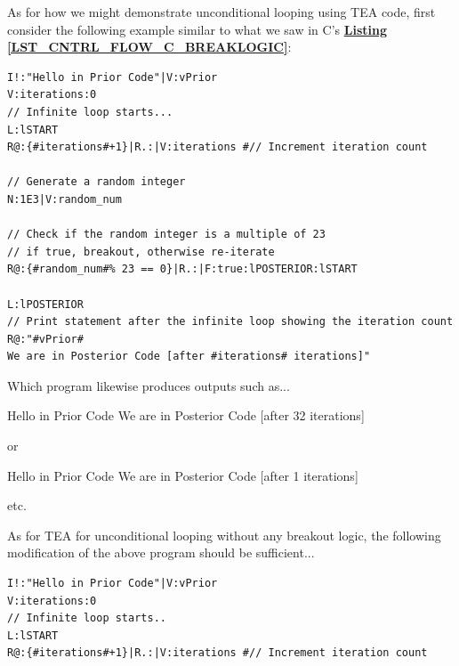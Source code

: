 \documentclass[a4paper, 18pt]{book} %
\begin{document}
{{{\begin{appendices}
As for how we might demonstrate unconditional looping using TEA code, first consider the following example similar to what we saw in C's \textbf{\hyperref[LST_CNTRL_FLOW_C_BREAKLOGIC]{Listing \ref{LST_CNTRL_FLOW_C_BREAKLOGIC}}}:



   
         \begin{tcolorbox}[teaterminalstyle,]
         \begin{lstlisting}[language=TEA,breaklines=true,]
I!:"Hello in Prior Code"|V:vPrior
V:iterations:0
// Infinite loop starts...
L:lSTART
R@:{#iterations#+1}|R.:|V:iterations #// Increment iteration count
        
// Generate a random integer
N:1E3|V:random_num

// Check if the random integer is a multiple of 23
// if true, breakout, otherwise re-iterate
R@:{#random_num#% 23 == 0}|R.:|F:true:lPOSTERIOR:lSTART

L:lPOSTERIOR
// Print statement after the infinite loop showing the iteration count
R@:"#vPrior#
We are in Posterior Code [after #iterations# iterations]"
          \end{lstlisting}
         \end{tcolorbox}
       
       \vspace{2em}


Which program likewise produces outputs such as...


         \begin{tcbverbatim}
Hello in Prior Code
We are in Posterior Code [after 32 iterations]
          \end{tcbverbatim}
        
        or
        
      
               \begin{tcbverbatim}
Hello in Prior Code
We are in Posterior Code [after 1 iterations]
                \end{tcbverbatim}  

etc.


\vspace{2em}

As for TEA for unconditional looping without any breakout logic, the following modification of the above program should be sufficient...


   
         \begin{tcolorbox}[teaterminalstyle,]
         \begin{lstlisting}[language=TEA,breaklines=true,]
I!:"Hello in Prior Code"|V:vPrior
V:iterations:0
// Infinite loop starts..
L:lSTART
R@:{#iterations#+1}|R.:|V:iterations #// Increment iteration count
        

\end{lstlisting}
\end{tcolorbox}
\end{appendices}}}}
\end{document}

